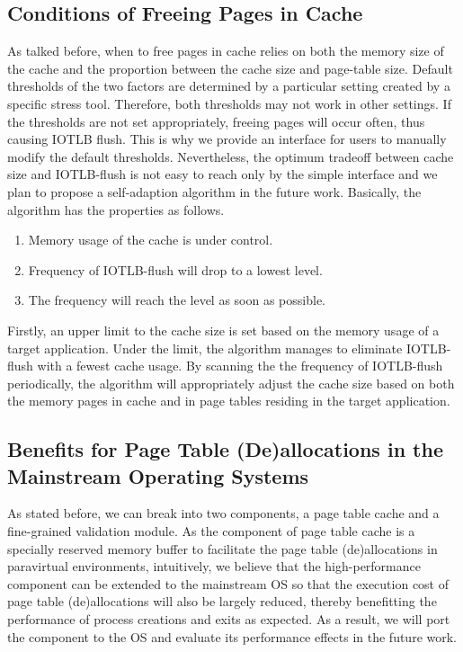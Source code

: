 \subsection{Conditions of Freeing Pages in Cache}

As talked before, when to free pages in cache relies on both the memory size of the cache and the proportion between the cache size and page-table size. Default thresholds of the two factors are determined by a particular setting created by a specific stress tool. Therefore, both thresholds may not work in other settings. If the thresholds are not set appropriately, freeing pages will occur often, thus causing IOTLB flush. This is why we provide an interface for users to manually modify the default thresholds. Nevertheless, the optimum tradeoff between cache size and IOTLB-flush is not easy to reach only by the simple interface and we plan to propose a self-adaption algorithm in the future work. Basically, the algorithm has the properties as follows.
\begin{enumerate}
\item Memory usage of the cache is under control.
\item Frequency of IOTLB-flush will drop to a lowest level.
\item The frequency will reach the level as soon as possible.
\end{enumerate}

Firstly, an upper limit to the cache size is set based on the memory usage of a target application. Under the limit, the algorithm manages to eliminate IOTLB-flush with a fewest cache usage. By scanning the the frequency of IOTLB-flush periodically, the algorithm will appropriately adjust the cache size based on both the memory pages in cache and in page tables residing in the target application.



\subsection{Benefits for Page Table (De)allocations in the Mainstream Operating Systems}

As stated before, we can break \name into two components, a page table cache and a fine-grained validation module. As the component of page table cache is a specially reserved memory buffer to facilitate the page table (de)allocations in paravirtual environments, intuitively, we believe that the high-performance component can be extended to the mainstream OS so that the execution cost of page table (de)allocations will also be largely reduced, thereby benefitting the performance of process creations and exits as expected. As a result, we will port the component to the OS and evaluate its performance effects in the future work.

